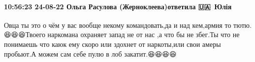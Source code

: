  
 
 
 
 

\paragraph{10:56:23 24-08-22 Ольга Расулова (Жерноклеева)ответила 🇺🇦💙💛Юлія}

Овца ты это о чём у вас вообще некому командовать,да и над кем,армия то
тютю.😆😆😆Твоего наркомана охраняет запад не от нас ,а что бы не збег.Ты что
не понимаешь что каюк ему скоро или здохнет от наркоты,или свои амеры пробьют.А
можем сам себе пулю в лоб закатит.😆😆😆😆
